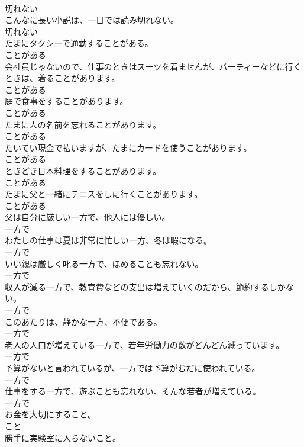 \documentclass[8pt]{extreport}
\begin{document}
\begin{CJK}{UTF8}{min}
\\	切れない
\\	こんなに長い小説は、一日では読み切れない。	
\\	切れない
\\	たまにタクシーで通勤することがある。	
\\	ことがある
\\	会社員じゃないので、仕事のときはスーツを着ませんが、パーティーなどに行くときは、着ることがあります。	
\\	ことがある
\\	庭で食事をすることがあります。	
\\	ことがある
\\	たまに人の名前を忘れることがあります。	
\\	ことがある
\\	たいてい現金で払いますが、たまにカードを使うことがあります。	
\\	ことがある
\\	ときどき日本料理をすることがあります。	
\\	ことがある
\\	たまに父と一緒にテニスをしに行くことがあります。	
\\	ことがある
\\	父は自分に厳しい一方で、他人には優しい。	
\\	一方で
\\	わたしの仕事は夏は非常に忙しい一方、冬は暇になる。	
\\	一方で
\\	いい親は厳しく叱る一方で、ほめることも忘れない。	
\\	一方で
\\	収入が減る一方で、教育費などの支出は増えていくのだから、節約するしかない。	
\\	一方で
\\	このあたりは、静かな一方、不便である。	
\\	一方で
\\	老人の人口が増えている一方で、若年労働力の数がどんどん減っています。	
\\	一方で
\\	予算がないと言われているが、一方では予算がむだに使われている。	
\\	一方で
\\	仕事をする一方で、遊ぶことも忘れない、そんな若者が増えている。	
\\	一方で
\\	お金を大切にすること。	
\\	こと
\\	勝手に実験室に入らないこと。	

\end{CJK}
\end{document}
